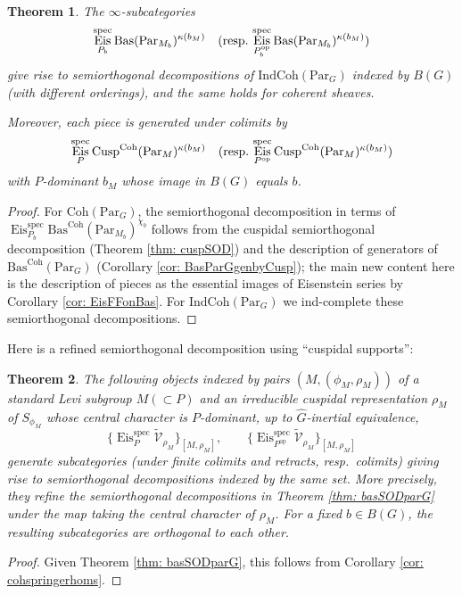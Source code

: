 \documentclass{amsart}
\newtheorem{theorem}{Theorem}[subsection]
\theoremstyle{definition}
\theoremstyle{remark}
\numberwithin{equation}{section}
\newcommand{\mc}{\mathcal}
\newcommand{\spec}{\mathrm{spec}}
\newcommand{\op}{\mathrm{op}}
\newcommand{\wh}{\widehat}
\newcommand{\Par}{\mathrm{Par}}
\newcommand{\IndCoh}{\mathrm{IndCoh}}
\DeclareMathOperator{\Eis}{\mathrm{Eis}}
\newcommand{\Coh}{\mathrm{Coh}}
\newcommand{\Cusp}{\mathrm{Cusp}}
\newcommand{\Bas}{\mathrm{Bas}}
\begin{document}
\begin{theorem}{\label{thm: basSODparG}}
The $\infty$-subcategories 
\[
 \Eis^\spec_{P_b} \Bas (\Par_{M_b})^{\kappa(b_M)} \quad (\textnormal{resp.~$\Eis^\spec_{P_b^\op} \Bas (\Par_{M_b})^{\kappa(b_M)}$})
\]
give rise to semiorthogonal decompositions of $\IndCoh(\Par_G)$ indexed by $B(G)$ (with different orderings), and the same holds for coherent sheaves. 

Moreover, each piece is generated under colimits by 
\[
\Eis^\spec_P \Cusp^\Coh(\Par_M)^{\kappa(b_M)}\quad (\textnormal{resp.~$\Eis^\spec_{P^\op} \Cusp^\Coh(\Par_M)^{\kappa(b_M)}$})
\]
with $P$-dominant $b_M$ whose image in $B(G)$ equals $b$.
\end{theorem}

\begin{proof}
For $\Coh(\Par_G)$, the semiorthogonal decomposition in terms of $\Eis^\spec_{P_b} \Bas^\Coh(\Par_{M_b})^{\chi_b}$ follows from the cuspidal semiorthogonal decomposition (Theorem \ref{thm: cuspSOD}) and the description of generators of $\Bas^{\Coh}(\Par_G)$ (Corollary \ref{cor: BasParGgenbyCusp}); the main new content here is the description of pieces as the essential images of Eisenstein series by Corollary \ref{cor: EisFFonBas}. For $\IndCoh(\Par_G)$ we ind-complete these semiorthogonal decompositions. 
\end{proof}

Here is a refined semiorthogonal decomposition using ``cuspidal supports'':

\begin{theorem}{\label{thm: SODcuspsupp}}
The following objects indexed by pairs $(M, (\phi_M, \rho_M))$ of a standard Levi subgroup $M(\subset P)$ and an irreducible cuspidal representation $\rho_{M}$ of $S_{\phi_{M}}$ whose central character is $P$-dominant, up to $\wh G$-inertial equivalence,
\[
\{ \Eis^\spec_P \widetilde{\mc V}_{\rho_M} \}_{[M,\rho_M]}, \qquad \{ \Eis^\spec_{P^\op} \widetilde{\mc V}_{\rho_M} \}_{[M,\rho_M]}
\]
generate subcategories (under finite colimits and retracts, resp.~colimits) giving rise to semiorthogonal decompositions indexed by the same set. More precisely, they refine the semiorthogonal decompositions in Theorem \ref{thm: basSODparG} under the map taking the central character of $\rho_M$. For a fixed $b \in B(G)$, the resulting subcategories are orthogonal to each other.  
\end{theorem}

\begin{proof}
Given Theorem \ref{thm: basSODparG}, this follows from Corollary \ref{cor: cohspringerhoms}.  
\end{proof}
\end{document}
